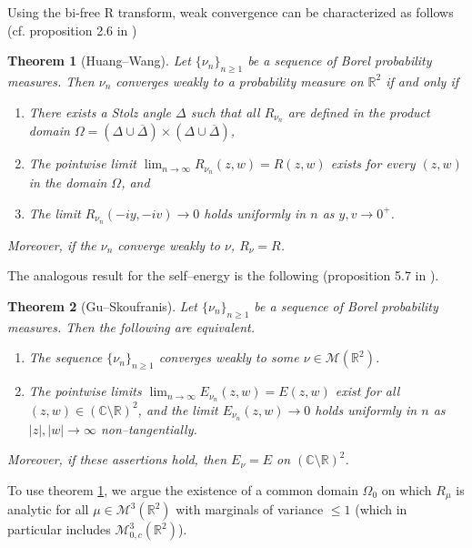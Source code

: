\documentclass{amsart}
\newtheorem{theorem}{Theorem}[section]
\theoremstyle{definition}
\theoremstyle{remark}
\numberwithin{equation}{section}
\begin{document}
Using the bi-free R transform, weak convergence can be characterized as follows (cf. proposition 2.6 in \cite{HuangWang})
\begin{theorem}[Huang--Wang]\label{charbi}
    Let $\{\nu_n\}_{n\geq 1}$ be a sequence of Borel probability measures. Then $\nu_n$ converges weakly to a probability measure on $\mathbb{R}^2$ if and only if 
    \begin{enumerate}
        \item There exists a Stolz angle $\Delta$ such that all $R_{\nu_n}$ are defined in the product domain $\Omega=(\Delta\cup\overline{\Delta})\times (\Delta\cup\overline{\Delta})$,
        \item The pointwise limit $\lim_{n\to\infty}R_{\nu_n}(z,w)=R(z,w)$ exists for every $(z,w)$ in the domain $\Omega$, and
        \item The limit $R_{\nu_n}(-iy,-iv)\to 0$ holds uniformly in $n$ as $y,v\to 0^+$. 
    \end{enumerate}
    Moreover, if the $\nu_n$ converge weakly to $\nu$, $R_\nu=R$. 
\end{theorem}
The analogous result for the self--energy is the following (proposition 5.7 in \cite{GuSkoufranis}).
\begin{theorem}[Gu--Skoufranis]\label{charbibool} Let $\{\nu_n\}_{n\geq 1}$ be a sequence of Borel probability measures. Then the following are equivalent.
     \begin{enumerate}
         \item The sequence $\{\nu_n\}_{n\geq 1}$ converges weakly to some $\nu\in \mathcal{M}(\mathbb{R}^2)$.
         \item The pointwise limits $\lim_{n\to \infty}E_{\nu_n}(z,w)=E(z,w)$ exist for all $(z,w)\in(\mathbb{C}\setminus\mathbb{R})^2$, and the limit $E_{\nu_n}(z,w)\to 0$ holds uniformly in $n$ as $|z|,|w|\to\infty$ non--tangentially.
     \end{enumerate}
     Moreover, if these assertions hold, then $E_\nu=E$ on $(\mathbb{C}\setminus\mathbb{R})^2$.
\end{theorem}

\noindent To use theorem \ref{charbi}, we argue the existence of a common domain $\Omega_0$ on which $R_\mu$ is analytic for all $\mu\in \mathcal{M}^3(\mathbb{R}^2)$ with marginals of variance $\leq 1$ (which in particular includes $\mathcal{M}_{0,c}^3(\mathbb{R}^2)$).
\end{document}
